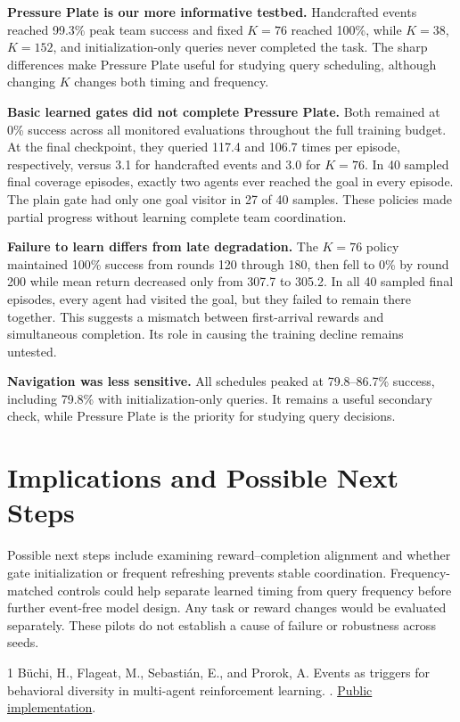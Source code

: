 \documentclass{article}
\begin{document}
\textbf{Pressure Plate is our more informative testbed.} Handcrafted events reached 99.3\% peak team success and fixed $K=76$ reached 100\%, while $K=38$, $K=152$, and initialization-only queries never completed the task. The sharp differences make Pressure Plate useful for studying query scheduling, although changing $K$ changes both timing and frequency.

\textbf{Basic learned gates did not complete Pressure Plate.} Both remained at 0\% success across all monitored evaluations throughout the full training budget. At the final checkpoint, they queried 117.4 and 106.7 times per episode, respectively, versus 3.1 for handcrafted events and 3.0 for $K=76$. In 40 sampled final coverage episodes, exactly two agents ever reached the goal in every episode. The plain gate had only one goal visitor in 27 of 40 samples. These policies made partial progress without learning complete team coordination.

\textbf{Failure to learn differs from late degradation.} The $K=76$ policy maintained 100\% success from rounds 120 through 180, then fell to 0\% by round 200 while mean return decreased only from 307.7 to 305.2. In all 40 sampled final episodes, every agent had visited the goal, but they failed to remain there together. This suggests a mismatch between first-arrival rewards and simultaneous completion. Its role in causing the training decline remains untested.

\textbf{Navigation was less sensitive.} All schedules peaked at 79.8--86.7\% success, including 79.8\% with initialization-only queries. It remains a useful secondary check, while Pressure Plate is the priority for studying query decisions.

\section{Implications and Possible Next Steps}

Possible next steps include examining reward--completion alignment and whether gate initialization or frequent refreshing prevents stable coordination. Frequency-matched controls could help separate learned timing from query frequency before further event-free model design. Any task or reward changes would be evaluated separately. These pilots do not establish a cause of failure or robustness across seeds.

\begin{thebibliography}{1}
B\"uchi, H., Flageat, M., Sebasti\'an, E., and Prorok, A.
\newblock Events as triggers for behavioral diversity in multi-agent reinforcement learning.
. \href{https://github.com/proroklab/Events-MARL}{Public implementation}.
\end{thebibliography}
\end{document}
